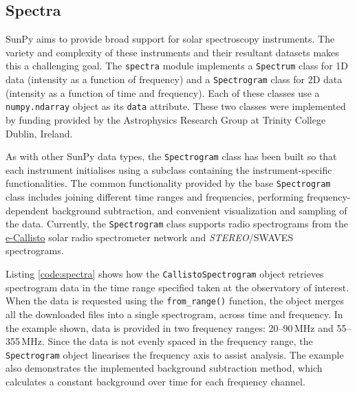 \subsection{Spectra}\label{sec:spectra}
SunPy aims to provide broad support for solar spectroscopy
instruments.  The variety and complexity of these instruments and
their resultant datasets makes this a challenging goal.  The \texttt{spectra} module implements a
\texttt{Spectrum} class for 1D data (intensity as a function of frequency) and a
\texttt{Spectrogram} class for 2D data (intensity as a function of time and
frequency).  Each of these classes use a \texttt{numpy.ndarray} object
as its \texttt{data} attribute.  These two classes were implemented
by funding provided by the Astrophysics Research Group at Trinity
College Dublin, Ireland.

As with other SunPy data types, the \texttt{Spectrogram} class has been
built so that each instrument initialises using a subclass containing the instrument-specific 
functionalities. The common functionality provided by the base \texttt{Spectrogram} class includes
joining different time ranges and frequencies, performing frequency-dependent background subtraction,
and convenient visualization and sampling of the data.
Currently, the \texttt{Spectrogram} class supports radio spectrograms from the 
\href{http://www.e-callisto.org/}{e-Callisto}
solar radio spectrometer network and \textit{STEREO}/SWAVES spectrograms.

Listing \ref{code:spectra} shows how the \texttt{CallistoSpectrogram}
object retrieves spectrogram data in the time range specified taken at
the observatory of interest.  When the data is requested using the
\texttt{from\_range()} function, the object merges all the downloaded
files into a single spectrogram, across time and frequency.
In the example shown, data is provided in two frequency ranges:
20--90\,MHz and 55--355\,MHz.  Since the data is not evenly spaced in
the frequency range, the \texttt{Spectrogram} object linearises the
frequency axis to assist analysis.  The example also demonstrates
the implemented background subtraction method, which calculates
a constant background over time for each frequency channel.

